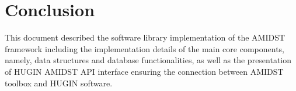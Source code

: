 \section{Conclusion}\label{sec:Conclusion}

This document described the software library implementation of the AMIDST framework including the implementation details of the main core components, namely, data structures and database functionalities, as well as the presentation of HUGIN AMIDST API interface ensuring the connection between AMIDST toolbox and HUGIN software.